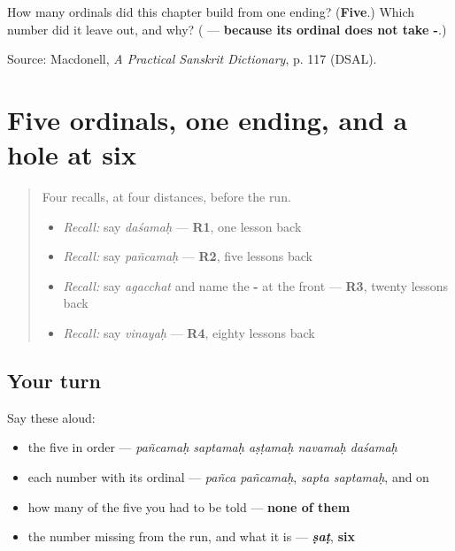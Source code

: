 \begin{tcolorbox}[breakable,colback=teal!4,colframe=teal!35!black,title={Before you move on}]
How many ordinals did this chapter build from one ending? (\textbf{Five}.) Which number did it leave out, and why? (\emph{\textbf{}} — \textbf{because its ordinal does not take -}.)

Source: Macdonell, \emph{A Practical Sanskrit Dictionary}, p. 117 (DSAL).
\end{tcolorbox}
\section[\texorpdfstring{\sk{पञ्चमः} · \sk{सप्तमः} … (pañcamaḥ …)}{पञ्चमः · सप्तमः … (pañcamaḥ …)}]{Five ordinals, one ending, and a hole at six}

\label{lesson:SA-R62-the-ending}



\begin{quote}
Four recalls, at four distances, before the run.

\begin{itemize}
\raggedright
  \item \emph{Recall:} say \emph{daśamaḥ} — \textbf{R1}, one lesson back
  \item \emph{Recall:} say \emph{pañcamaḥ} — \textbf{R2}, five lessons back
  \item \emph{Recall:} say \emph{agacchat} and name the \textbf{-} at the front — \textbf{R3}, twenty lessons back
  \item \emph{Recall:} say \emph{vinayaḥ} — \textbf{R4}, eighty lessons back
\end{itemize}
\end{quote}

\subsection*{Your turn}
Say these aloud:

\begin{itemize}
\raggedright
  \item the five in order — \emph{pañcamaḥ saptamaḥ aṣṭamaḥ navamaḥ daśamaḥ}
  \item each number with its ordinal — \emph{pañca pañcamaḥ}, \emph{sapta saptamaḥ}, and on
  \item how many of the five you had to be told — \textbf{none of them}
  \item the number missing from the run, and what it is — \emph{\textbf{ṣaṭ}}, \textbf{six}
\end{itemize}

